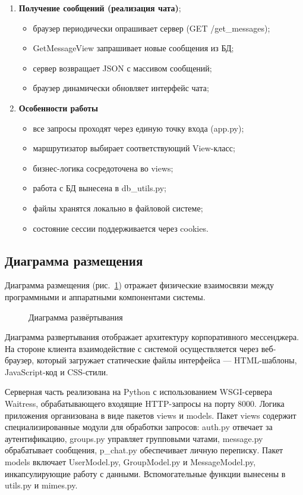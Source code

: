 \begin{enumerate}[leftmargin=*,label=\textbf{\arabic*.}]
	\item \textbf{Получение сообщений (реализация чата)};
	\begin{itemize}
		\item браузер периодически опрашивает сервер (GET /get\_messages);
		\item GetMessageView запрашивает новые сообщения из БД;
		\item сервер возвращает JSON с массивом сообщений;
		\item браузер динамически обновляет интерфейс чата;
	\end{itemize}
	
	\item \textbf{Особенности работы}
	\begin{itemize}
		\item все запросы проходят через единую точку входа (app.py);
		\item маршрутизатор выбирает соответствующий View-класс;
		\item бизнес-логика сосредоточена во views;
		\item работа с БД вынесена в db\_utils.py;
		\item файлы хранятся локально в файловой системе;
		\item состояние сессии поддерживается через cookies.
	\end{itemize}
\end{enumerate}

\subsection{Диаграмма размещения}

Диаграмма размещения (рис.~\ref{place:image}) отражает физические взаимосвязи между программными и аппаратными компонентами системы.

\begin{figure}[ht]
\caption{Диаграмма развёртывания}
\label{place:image}
\end{figure}

Диаграмма развертывания отображает архитектуру корпоративного мессенджера. На стороне клиента взаимодействие с системой осуществляется через веб-браузер, который загружает статические файлы интерфейса — HTML-шаблоны, JavaScript-код и CSS-стили.

Серверная часть реализована на Python с использованием WSGI-сервера Waitress, обрабатывающего входящие HTTP-запросы на порту 8000. Логика приложения организована в виде пакетов views и models. Пакет views содержит специализированные модули для обработки запросов: auth.py отвечает за аутентификацию, groups.py управляет групповыми чатами, message.py обрабатывает сообщения, p\_chat.py обеспечивает личную переписку. Пакет models включает UserModel.py, GroupModel.py и MessageModel.py, инкапсулирующие работу с данными. Вспомогательные функции вынесены в utils.py и mimes.py.

